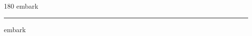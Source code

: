 
\begin{frame}
\begin{center}
\begin{turn}{180}
{\fontsize{2.5cm}{1em}\selectfont embark}
\end{turn}
\vspace{1em}\par  
\hrule
\vspace{1em}\par  
{\fontsize{2.5cm}{1em}\selectfont embark}
\end{center}
\end{frame}
